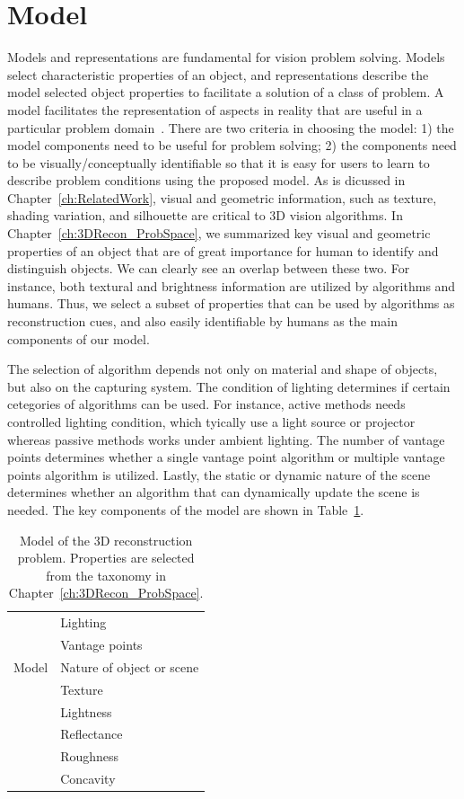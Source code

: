 \section{Model}
\label{sec:3DRecon_Model}
Models and representations are fundamental for vision problem solving. Models select characteristic properties of an object, and representations describe the model selected object properties to facilitate a solution of a class of problem. A model facilitates the representation of aspects in reality that are useful in a particular problem domain~\cite{bolles19863dpo}. There are two criteria in choosing the model: 1) the model components need to be useful for problem solving; 2) the components need to be visually/conceptually identifiable so that it is easy for users to learn to describe problem conditions using the proposed model. As is dicussed in Chapter~\ref{ch:RelatedWork}, visual and geometric information, such as texture, shading variation, and silhouette are critical to 3D vision algorithms. In Chapter~\ref{ch:3DRecon_ProbSpace}, we summarized key visual and geometric properties of an object that are of great importance for human to identify and distinguish objects. We can clearly see an overlap between these two. For instance, both textural and brightness information are utilized by algorithms and humans. Thus, we select a subset of properties that can be used by algorithms as reconstruction cues, and also easily identifiable by humans as the main components of our model.

The selection of algorithm depends not only on material and shape of objects, but also on the capturing system. The condition of lighting determines if certain cetegories of algorithms can be used. For instance, active methods needs controlled lighting condition, which tyically use a light source or projector whereas passive methods works under ambient lighting. The number of vantage points determines whether a single vantage point algorithm or multiple vantage points algorithm is utilized. Lastly, the static or dynamic nature of the scene determines whether an algorithm that can dynamically update the scene is needed. The key components of the model are shown in Table~\ref{tab:3DRecon_model}.
\begin{table}[!htbp]
  \centering
  \begin{tabular}{l|l}
  \toprule
  \multirow{5}{*}{Model} 
  & Lighting \\
  & Vantage points \\
  & Nature of object or scene \\
  & Texture \\
  & Lightness \\
  & Reflectance \\
  & Roughness \\
  & Concavity \\
  \bottomrule
  \end{tabular}
  \caption{Model of the 3D reconstruction problem. Properties are selected from the taxonomy in Chapter~\ref{ch:3DRecon_ProbSpace}.}
  \label{tab:3DRecon_model}
\end{table}

